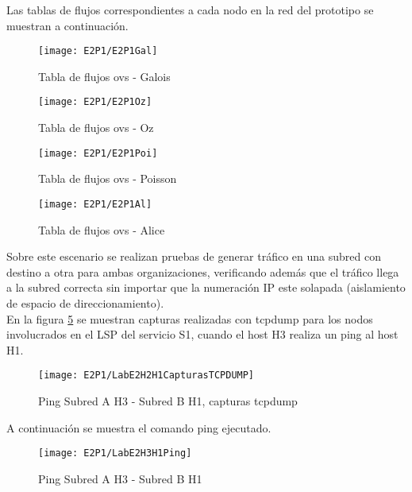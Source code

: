 Las tablas de flujos correspondientes a cada nodo en la red del prototipo se muestran a continuaci\'on.

\newpage
\begin{figure}[ht!] 
\centering    
\texttt{[image: E2P1/E2P1Gal]}
\caption[Tabla de flujos ovs - Galois]{Tabla de flujos ovs - Galois}
\label{fig:CU1P1DumpFlows1}
\end{figure}

\begin{figure}[h!] 
\centering    
\texttt{[image: E2P1/E2P1Oz]}
\caption[Tabla de flujos ovs - Oz]{Tabla de flujos ovs - Oz}
\label{fig:CU1P1DumpFlows2}
\end{figure}

\begin{figure}[h!] 
\centering    
\texttt{[image: E2P1/E2P1Poi]}
\caption[Tabla de flujos ovs - Poisson]{Tabla de flujos ovs - Poisson}
\label{fig:CU1P1DumpFlows3}
\end{figure}

\newpage
\begin{figure}[ht!] 
\centering    
\texttt{[image: E2P1/E2P1Al]}
\caption[Tabla de flujos ovs - Alice]{Tabla de flujos ovs - Alice}
\label{fig:CU1P1DumpFlows4}
\end{figure}

Sobre este escenario se realizan pruebas de generar tr\'afico en una subred con destino a otra para ambas organizaciones, verificando adem\'as que el tr\'afico llega a la subred correcta sin importar que la numeraci\'on IP este solapada (aislamiento de espacio de direccionamiento).\\

En la figura \ref{fig:CU1P1DumpFlows5} se muestran capturas realizadas con tcpdump para los nodos involucrados en el LSP del servicio S1, cuando el host H3 realiza un ping al host H1.\\
\begin{figure}[h!] 
\centering    
\texttt{[image: E2P1/LabE2H2H1CapturasTCPDUMP]}
\caption[Ping Subred A H3 - Subred B H1, capturas tcpdump]{Ping Subred A H3 - Subred B H1, capturas tcpdump}
\label{fig:CU1P1DumpFlows5}
\end{figure}

A continuaci\'on se muestra el comando ping ejecutado.

\begin{figure}[h!] 
\centering    
\texttt{[image: E2P1/LabE2H3H1Ping]}
\caption[Ping Subred A H3 - Subred B H1]{Ping Subred A H3 - Subred B H1}
\label{fig:CU1P1DumpFlows6}
\end{figure}
